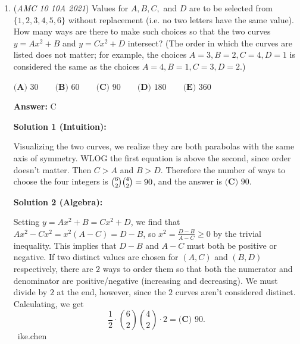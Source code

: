 \begin{enumerate}
\textbf{Solution 3 (brute force)}

Same as solution 1, we find the roots are $1, 1, 2, 2, 2, 2$ by Vieta's formula. This next part is brute force expansion.$-B=\\r_1r_2r_3+r_1r_2r_4+r_1r_2r_5+r_1r_2r_6+\\r_1r_3r_4+r_1r_3r_5+r_1r_3r_6+\\r_1r_4r_5+r_1r_4r_6+\\r_1r_5r_6+\\r_2r_3r_4+r_2r_3r_5+r_2r_3r_6+\\r_2r_4r_5+r_2r_4r_6+\\r_2r_5r_6+\\r_3r_4r_5+r_3r_4r_6+\\r_3r_5r_6+\\r_4r_5r_6\\=2 \times 4 + 4 \times 12 + 8 \times 4\\ =8 + 48 + 32\\B = \boxed{\textbf{(A) }{-}88}$



	\item (\textit{AMC 10 10A 2021}) Values for $A,B,C,$ and $D$ are to be selected from $\{1, 2, 3, 4, 5, 6\}$ without replacement (i.e. no two letters have the same value). How many ways are there to make such choices so that the two curves $y=Ax^2+B$ and $y=Cx^2+D$ intersect? (The order in which the curves are listed does not matter; for example, the choices $A=3, B=2, C=4, D=1$ is considered the same as the choices $A=4, B=1, C=3, D=2.$)


 $\textbf{(A) }30 \qquad \textbf{(B) }60 \qquad \textbf{(C) }90 \qquad \textbf{(D) }180 \qquad \textbf{(E) }360$

 \textbf{Answer: }C



\textbf{Solution 1 (Intuition):}

Visualizing the two curves, we realize they are both parabolas with the same axis of symmetry. WLOG the first equation is above the second, since order doesn't matter. Then $C>A$ and $B>D$. Therefore the number of ways to choose the four integers is $\tbinom{6}{2}\tbinom{4}{2}=90$, and the answer is $\boxed{\textbf{(C) }90}$. 

 



\textbf{Solution 2 (Algebra):}

Setting $y = Ax^2+B = Cx^2+D$, we find that $Ax^2-Cx^2 = x^2(A-C) = D-B$, so $x^2 = \frac {D-B}{A-C} \ge 0$ by the trivial inequality. This implies that $D-B$ and $A-C$ must both be positive or negative. If two distinct values are chosen for $(A, C)$ and $(B, D)$ respectively, there are $2$ ways to order them so that both the numerator and denominator are positive/negative (increasing and decreasing). We must divide by $2$ at the end, however, since the $2$ curves aren't considered distinct. Calculating, we get 
 \[\frac {1}{2} \cdot \binom {6}{2} \binom {4}{2} \cdot 2 = \boxed{\textbf{(C) }90}.\] ~ike.chen


\end{enumerate}
